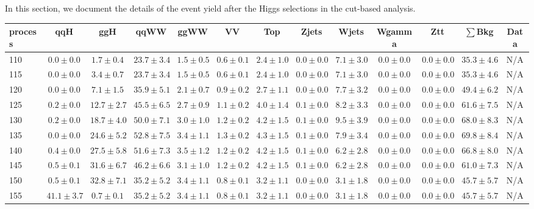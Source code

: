 In this section, we document the details of the event yield after the Higgs 
selections in the cut-based analysis.

\begin{table}
{%
 \tiny
 \begin{center}
 \begin{tabular}{l | c c | c c c c c c c c  | c c}
 \hline
 process & qqH & ggH & qqWW & ggWW & VV & Top & Zjets & Wjets & Wgamma & Ztt & $\sum$Bkg & Data \\
 \hline
110 & $0.0\pm0.0$ & $1.7\pm0.4$ & $23.7\pm3.4$ & $1.5\pm0.5$ & $0.6\pm0.1$ & $2.4\pm1.0$ & $0.0\pm0.0$ & $7.1\pm3.0$ & $0.0\pm0.0$ & $0.0\pm0.0$ & $35.3\pm4.6$ & N/A \\
115 & $0.0\pm0.0$ & $3.4\pm0.7$ & $23.7\pm3.4$ & $1.5\pm0.5$ & $0.6\pm0.1$ & $2.4\pm1.0$ & $0.0\pm0.0$ & $7.1\pm3.0$ & $0.0\pm0.0$ & $0.0\pm0.0$ & $35.3\pm4.6$ & N/A \\
120 & $0.0\pm0.0$ & $7.1\pm1.5$ & $35.9\pm5.1$ & $2.1\pm0.7$ & $0.9\pm0.2$ & $2.7\pm1.1$ & $0.0\pm0.0$ & $7.7\pm3.2$ & $0.0\pm0.0$ & $0.0\pm0.0$ & $49.4\pm6.2$ & N/A \\
125 & $0.2\pm0.0$ & $12.7\pm2.7$ & $45.5\pm6.5$ & $2.7\pm0.9$ & $1.1\pm0.2$ & $4.0\pm1.4$ & $0.1\pm0.0$ & $8.2\pm3.3$ & $0.0\pm0.0$ & $0.0\pm0.0$ & $61.6\pm7.5$ & N/A \\
130 & $0.2\pm0.0$ & $18.7\pm4.0$ & $50.0\pm7.1$ & $3.0\pm1.0$ & $1.2\pm0.2$ & $4.2\pm1.5$ & $0.1\pm0.0$ & $9.5\pm3.9$ & $0.0\pm0.0$ & $0.0\pm0.0$ & $68.0\pm8.3$ & N/A \\
135 & $0.0\pm0.0$ & $24.6\pm5.2$ & $52.8\pm7.5$ & $3.4\pm1.1$ & $1.3\pm0.2$ & $4.3\pm1.5$ & $0.1\pm0.0$ & $7.9\pm3.4$ & $0.0\pm0.0$ & $0.0\pm0.0$ & $69.8\pm8.4$ & N/A \\
140 & $0.4\pm0.0$ & $27.5\pm5.8$ & $51.6\pm7.3$ & $3.5\pm1.2$ & $1.2\pm0.2$ & $4.2\pm1.5$ & $0.1\pm0.0$ & $6.2\pm2.8$ & $0.0\pm0.0$ & $0.0\pm0.0$ & $66.8\pm8.0$ & N/A \\
145 & $0.5\pm0.1$ & $31.6\pm6.7$ & $46.2\pm6.6$ & $3.1\pm1.0$ & $1.2\pm0.2$ & $4.2\pm1.5$ & $0.1\pm0.0$ & $6.2\pm2.8$ & $0.0\pm0.0$ & $0.0\pm0.0$ & $61.0\pm7.3$ & N/A \\
150 & $0.5\pm0.1$ & $32.8\pm7.1$ & $35.2\pm5.2$ & $3.4\pm1.1$ & $0.8\pm0.1$ & $3.2\pm1.1$ & $0.0\pm0.0$ & $3.1\pm1.8$ & $0.0\pm0.0$ & $0.0\pm0.0$ & $45.7\pm5.7$ & N/A \\
155 & $41.1\pm3.7$ & $0.7\pm0.1$ & $35.2\pm5.2$ & $3.4\pm1.1$ & $0.8\pm0.1$ & $3.2\pm1.1$ & $0.0\pm0.0$ & $3.1\pm1.8$ & $0.0\pm0.0$ & $0.0\pm0.0$ & $45.7\pm5.7$ & N/A \\

\end{tabular}
\end{center}}
\end{table}
